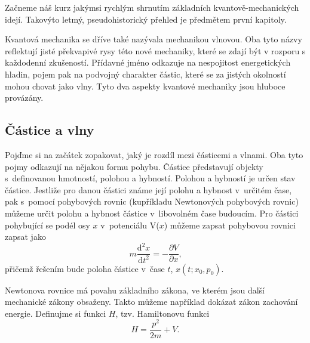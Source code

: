 \newcommand{\dd}{\mathrm{d}}

Začneme náš kurz jakýmsi rychlým shrnutím základních kvantově-mechanických idejí. Takovýto letmý, pseudohistorický přehled je předmětem první kapitoly.

Kvantová mechanika se dříve také nazývala mechanikou vlnovou. Oba tyto názvy reflektují jisté překvapivé rysy této nové mechaniky, které se zdají být v rozporu s každodenní zkušeností. Přídavné jméno  odkazuje na nespojitost energetických hladin, pojem  pak na podvojný charakter částic, které se za jistých okolností mohou chovat jako vlny. Tyto dva aspekty kvantové mechaniky jsou hluboce provázány.

\subsection{Částice a vlny}	
Pojďme si na začátek zopakovat, jaký je rozdíl mezi částicemi a vlnami. Oba tyto pojmy odkazují na nějakou formu pohybu. Částice představují objekty s~definovanou hmotností, polohou a hybností. Polohou a hybností je určen stav částice. Jestliže pro danou částici známe její polohu a hybnost v~určitém čase, pak s~pomocí pohybových rovnic (kupříkladu Newtonových pohybových rovnic) můžeme určit polohu a hybnost částice v~libovolném čase budoucím. Pro částici pohybující se podél osy $x$ v~potenciálu V($x$) můžeme zapsat pohybovou rovnici zapsat jako
\begin{equation}
m \frac{\mathrm{d}^2 x}{\mathrm{d}t^2} = -\frac{\partial{V}}{\partial{x}}  \mbox{,}
\label{rov:Castice}
\end{equation}
přičemž řešením bude poloha částice v~čase $t$, $x(t; x_0,p_0)$.

Newtonova rovnice má povahu základního zákona, ve kterém jsou další mechanické zákony obsaženy. Takto můžeme například dokázat zákon zachování energie. Definujme si funkci $H$, tzv. Hamiltonovu funkci
\begin{equation}
H = \frac{p^2}{2m}+V\mbox{.}
\label{rov:hamiltonfce}
\end{equation}

